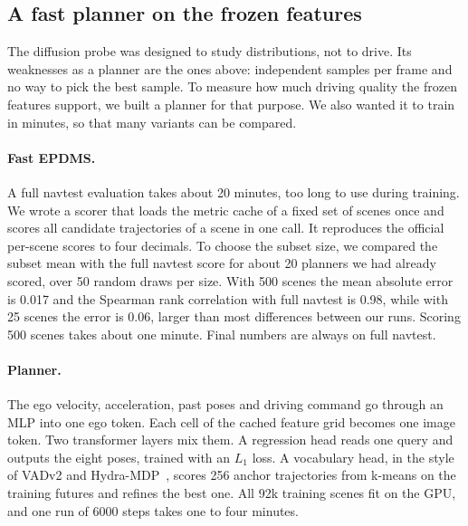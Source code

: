 \subsection{A fast planner on the frozen features}
\label{sec:fast-planner}

The diffusion probe was designed to study distributions, not to drive. Its
weaknesses as a planner are the ones above: independent samples per frame and no
way to pick the best sample. To measure how much driving quality the frozen
features support, we built a planner for that purpose. We also wanted it to train
in minutes, so that many variants can be compared.

\paragraph{Fast EPDMS.}
A full navtest evaluation takes about 20 minutes, too long to use during
training. We wrote a scorer that loads the metric cache of a fixed set of scenes
once and scores all candidate trajectories of a scene in one call. It reproduces
the official per-scene scores to four decimals. To choose the subset size, we
compared the subset mean with the full navtest score for about 20 planners we had
already scored, over 50 random draws per size. With 500 scenes the mean absolute
error is 0.017 and the Spearman rank correlation with full navtest is 0.98, while
with 25 scenes the error is 0.06, larger than most differences between our runs.
Scoring 500 scenes takes about one minute. Final numbers are always on full
navtest.

\paragraph{Planner.}
The ego velocity, acceleration, past poses and driving command go through an MLP
into one ego token. Each cell of the cached feature grid becomes one image token.
Two transformer layers mix them. A regression head reads one query and outputs
the eight poses, trained with an $L_1$ loss. A vocabulary head, in the style of
VADv2 and Hydra-MDP~\cite{vadv2,hydra_mdp}, scores 256 anchor trajectories from
k-means on the training futures and refines the best one. All 92k training scenes
fit on the GPU, and one run of 6000 steps takes one to four minutes.

